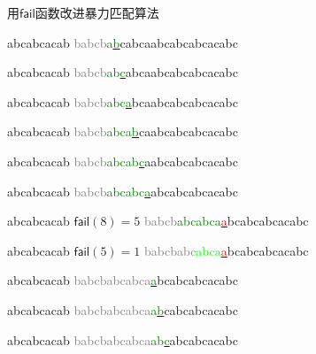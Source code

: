\documentclass{ctexbeamer}
\newcommand{\red}[1]{\textcolor{red}{#1}}
\newcommand{\green}[1]{\textcolor{green}{#1}}
\newcommand{\gray}[1]{\textcolor{gray}{#1}}
\newcommand{\lime}[1]{\textcolor{lime}{#1}}
\newcommand{\fail}{\mathsf{fail}}
\newcommand{\ugrn}[1]{\underline{\green{#1}}}
\newcommand{\ured}[1]{\underline{\red{#1}}}
\begin{document}
\begin{frame}[fragile]{用$\fail$函数改进暴力匹配算法}
\begin{minipage}[t]{0.33\textwidth}
\begin{tverb}[fontsize=\tiny]
     abcabcacab
\gray{babcb}\green{a}\ugrn{b}cabcaabcabcabcacabc
\end{tverb}

\begin{tverb}[fontsize=\tiny]
     abcabcacab
\gray{babcb}\green{ab}\ugrn{c}abcaabcabcabcacabc
\end{tverb}

\begin{tverb}[fontsize=\tiny]
     abcabcacab
\gray{babcb}\green{abc}\ugrn{a}bcaabcabcabcacabc
\end{tverb}

\begin{tverb}[fontsize=\tiny]
     abcabcacab
\gray{babcb}\green{abca}\underline{\green{b}}caabcabcabcacabc
\end{tverb}

\begin{tverb}[fontsize=\tiny]
     abcabcacab
\gray{babcb}\green{abcab}\underline{\green{c}}aabcabcabcacabc
\end{tverb}

\end{minipage}%
%
\begin{minipage}[t]{0.33\textwidth}

\begin{tverb}[fontsize=\tiny]
     abcabcacab
\gray{babcb}\green{abcabc}\underline{\green{a}}abcabcabcacabc
\end{tverb}

\begin{tverb}[fontsize=\tiny]
     abcabcacab \(\scriptstyle\fail(8)=5\)
\gray{babcb}\green{abcabca}\ured{a}bcabcabcacabc
\end{tverb}

\begin{tverb}[fontsize=\tiny]
        abcabcacab \(\scriptstyle\fail(5)=1\)
\gray{babcbabc}\lime{abca}\ured{a}bcabcabcacabc
\end{tverb}

\begin{tverb}[fontsize=\tiny]
            abcabcacab
\gray{babcbabcabca}\ugrn{a}bcabcabcacabc
\end{tverb}

\begin{tverb}[fontsize=\tiny]
            abcabcacab
\gray{babcbabcabca}\green{a}\ugrn{b}cabcabcacabc
\end{tverb}

\begin{tverb}[fontsize=\tiny]
            abcabcacab
\gray{babcbabcabca}\green{ab}\ugrn{c}abcabcacabc
\end{tverb}


\end{minipage}
\end{frame}
\end{document}
